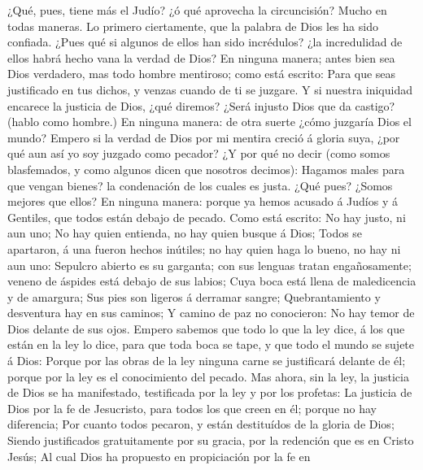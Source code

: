  ¿Qué, pues, tiene más el Judío? ¿ó qué aprovecha la
circuncisión?  Mucho en todas maneras. Lo primero
ciertamente, que la palabra de Dios les ha sido confiada. 
¿Pues qué si algunos de ellos han sido incrédulos? ¿la incredulidad de
ellos habrá hecho vana la verdad de Dios?  En ninguna
manera; antes bien sea Dios verdadero, mas todo hombre mentiroso; como
está escrito: Para que seas justificado en tus dichos, y venzas cuando
de ti se juzgare.  Y si nuestra iniquidad encarece la
justicia de Dios, ¿qué diremos? ¿Será injusto Dios que da castigo?
(hablo como hombre.)  En ninguna manera: de otra suerte
¿cómo juzgaría Dios el mundo?  Empero si la verdad de Dios
por mi mentira creció á gloria suya, ¿por qué aun así yo soy juzgado
como pecador?  ¿Y por qué no decir (como somos
blasfemados, y como algunos dicen que nosotros decimos): Hagamos males
para que vengan bienes? la condenación de los cuales es justa.
 ¿Qué pues? ¿Somos mejores que ellos? En ninguna manera:
porque ya hemos acusado á Judíos y á Gentiles, que todos están debajo de
pecado.  Como está escrito: No hay justo, ni aun uno;
 No hay quien entienda, no hay quien busque á Dios;
 Todos se apartaron, á una fueron hechos inútiles; no hay
quien haga lo bueno, no hay ni aun uno:  Sepulcro abierto
es su garganta; con sus lenguas tratan engañosamente; veneno de áspides
está debajo de sus labios;  Cuya boca está llena de
maledicencia y de amargura;  Sus pies son ligeros á
derramar sangre;  Quebrantamiento y desventura hay en sus
caminos;  Y camino de paz no conocieron: 
No hay temor de Dios delante de sus ojos.  Empero sabemos
que todo lo que la ley dice, á los que están en la ley lo dice, para que
toda boca se tape, y que todo el mundo se sujete á Dios: 
Porque por las obras de la ley ninguna carne se justificará delante de
él; porque por la ley es el conocimiento del pecado.  Mas
ahora, sin la ley, la justicia de Dios se ha manifestado, testificada
por la ley y por los profetas:  La justicia de Dios por
la fe de Jesucristo, para todos los que creen en él; porque no hay
diferencia;  Por cuanto todos pecaron, y están
destituídos de la gloria de Dios;  Siendo justificados
gratuitamente por su gracia, por la redención que es en Cristo Jesús;
 Al cual Dios ha propuesto en propiciación por la fe en
